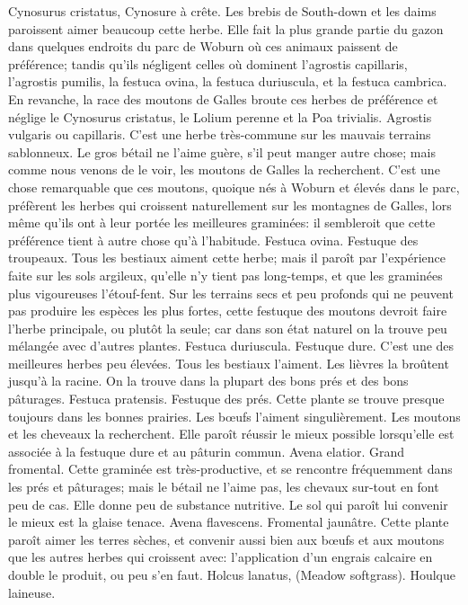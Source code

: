{Cynosurus cristatus, Cynosure à crête. Les brebis de South-down et les daims paroissent aimer beaucoup cette herbe. Elle fait la plus grande partie du gazon dans quelques endroits du parc de Woburn où ces animaux paissent de préférence; tandis qu’ils négligent celles où dominent l’agrostis capillaris, l’agrostis pumilis, la festuca ovina, la festuca duriuscula, et la festuca cambrica. En revanche, la race des moutons de Galles broute ces herbes de préférence et néglige le Cynosurus cristatus, le Lolium perenne et la Poa trivialis. Agrostis vulgaris ou capillaris. C’est une herbe très-commune sur les mauvais terrains sablonneux. Le gros bétail ne l’aime guère, s’il peut manger autre chose; mais comme nous venons de le voir, les moutons de Galles la recherchent. C’est une chose remarquable que ces moutons, quoique nés à Woburn et élevés dans le parc, préfèrent les herbes qui croissent naturellement sur les montagnes de Galles, lors même qu’ils ont à leur portée les meilleures graminées: il sembleroit que cette préférence tient à autre chose qu’à l’habitude. Festuca ovina. Festuque des troupeaux. Tous les bestiaux aiment cette herbe; mais il paroît par l’expérience faite sur les sols argileux, qu’elle n’y tient pas long-temps, et que les graminées plus vigoureuses l’étouf-fent. Sur les terrains secs et peu profonds qui ne peuvent pas produire les espèces les plus fortes, cette festuque des moutons devroit faire l'herbe principale, ou plutôt la seule; car dans son état naturel on la trouve peu mélangée avec d'autres plantes.
Festuca duriuscula. Festuque dure. C'est une des meilleures herbes peu élevées. Tous les bestiaux l'aiment. Les lièvres la broûtent jusqu'à la racine. On la trouve dans la plupart des bons prés et des bons pâturages.
Festuca pratensis. Festuque des prés. Cette plante se trouve presque toujours dans les bonnes prairies. Les bœufs l'aiment singulièrement. Les moutons et les cheveaux la recherchent. Elle paroît réussir le mieux possible lorsqu'elle est associée à la festuque dure et au pâturin commun.
Avena elatior. Grand fromental. Cette graminée est très-productive, et se rencontre fréquemment dans les prés et pâturages; mais le bétail ne l'aime pas, les chevaux sur-tout en font peu de cas. Elle donne peu de substance nutritive. Le sol qui paroît lui convenir le mieux est la glaise tenace.
Avena flavescens. Fromental jaunâtre. Cette plante paroît aimer les terres sèches, et convenir aussi bien aux bœufs et aux moutons que les autres herbes qui croissent avec: l'application d'un engrais calcaire en double le produit, ou peu s'en faut.
Holcus lanatus, (Meadow softgrass). Houlque laineuse.}
